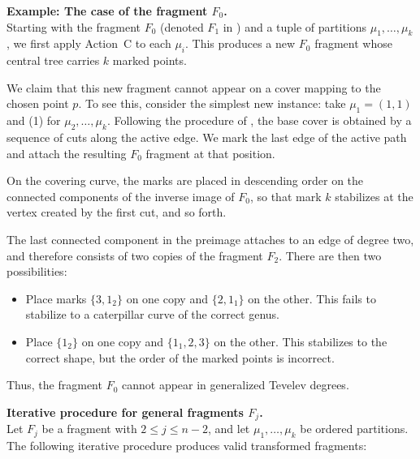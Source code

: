 \documentclass[11pt,reqno]{amsart}
\theoremstyle{definition}
\begin{document}
\vspace{0.5em}
\noindent\textbf{Example: The case of the fragment $F_0$.}\\
Starting with the fragment $F_0$ (denoted $F_1$ in \cite{troptev}) and a tuple of partitions $\mu_1,\dots,\mu_k$, we first apply Action~C to each $\mu_i$.  
This produces a new $F_0$ fragment whose central tree carries $k$ marked points.

We claim that this new fragment cannot appear on a cover mapping to the chosen point $p$.  
To see this, consider the simplest new instance: take $\mu_1=(1,1)$ and (1) for $\mu_2,\dots,\mu_k$.  
Following the procedure of \cite{troptev}, the base cover is obtained by a sequence of cuts along the active edge.  
We mark the last edge of the active path and attach the resulting $F_0$ fragment at that position.

On the covering curve, the marks are placed in descending order on the connected components of the inverse image of $F_0$, so that mark $k$ stabilizes at the vertex created by the first cut, and so forth.

The last connected component in the preimage attaches to an edge of degree two, and therefore consists of two copies of the fragment $F_2$.  
There are then two possibilities:

\begin{itemize}
    \item Place marks $\{3,1_2\}$ on one copy and $\{2,1_1\}$ on the other.  
    This fails to stabilize to a caterpillar curve of the correct genus.
    
    \item Place $\{1_2\}$ on one copy and $\{1_1,2,3\}$ on the other.  
    This stabilizes to the correct shape, but the order of the marked points is incorrect.
\end{itemize}

Thus, the fragment $F_0$ cannot appear in generalized Tevelev degrees.

\vspace{0.5em}
\noindent\textbf{Iterative procedure for general fragments $F_j$.}\\
Let $F_j$ be a fragment with $2 \le j \le n-2$, and let $\mu_1,\dots,\mu_k$ be ordered partitions.  
The following iterative procedure produces valid transformed fragments:
\end{document}
